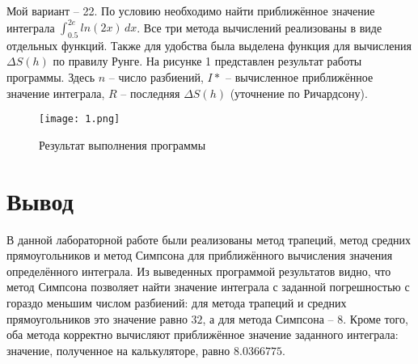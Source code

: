 \documentclass[a4paper, 14pt]{extarticle}
\begin{document}
Мой вариант -- 22. По условию необходимо найти приближённое значение интеграла $\int_{0.5}^{2e} ln(2x)\,dx$.
Все три метода вычислений реализованы в виде отдельных функций. Также для удобства была выделена 
функция для вычисления $\Delta S(h)$ по правилу Рунге. На рисунке 1 представлен результат работы программы. Здесь $n$ -- 
число разбиений, $I*$ -- вычисленное приближённое значение интеграла, $R$ -- последняя $\Delta S(h)$ (уточнение по 
Ричардсону).

\begin{figure}[H]
	
	\centering
	
	\texttt{[image: 1.png]}
	\captionsetup{justification=centering}
	\caption{Результат выполнения программы}
	
	\label{fig:mpr}
	
\end{figure}

\pagebreak

\section{Вывод}
В данной лабораторной работе были реализованы метод трапеций, метод средних прямоугольников и метод Симпсона 
для приближённого вычисления значения определённого интеграла. Из выведенных программой результатов видно, 
что метод Симпсона позволяет найти значение интеграла с заданной погрешностью с гораздо меньшим числом разбиений: для метода трапеций и средних прямоугольников это значение равно $32$, а для метода Симпсона -- $8$. Кроме того, оба метода 
корректно вычисляют приближённое значение заданного интеграла: значение, полученное на калькуляторе, равно $8.0366775$.
\end{document}
